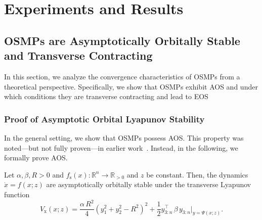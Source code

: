 \section{Experiments and Results}\label{sec:osmp:results}
\subsection{OSMPs are Asymptotically Orbitally Stable and Transverse Contracting}
In this section, we analyze the convergence characteristics of \glspl{OSMP} from a theoretical perspective. Specifically, we show that \glspl{OSMP} exhibit \gls{AOS} and under which conditions they are transverse contracting and lead to \gls{EOS}

\subsubsection{Proof of Asymptotic Orbital Lyapunov Stability}
In the general setting, we show that \glspl{OSMP} possess \gls{AOS}. This property was noted—but not fully proven—in earlier work~\citep{urain2020imitationflow,zhi2024teaching}. Instead, in the following, we formally prove \gls{AOS}.
\begin{theorem}\label{theorem:osmp:asymptotic_orbital_stability}
    Let $\alpha, \beta, R > 0$ and $f_\mathrm{s}(x): \mathbb{R}^n \to \mathbb{R}_{>0}$ and $z$ be constant. Then, the dynamics $\dot{x} = f(x;z)$ are asymptotically orbitally stable under the transverse Lyapunov function
    \begin{equation}
        V_\mathrm{x}(x;z) = \frac{\alpha \, R^2}{4} \left ( y_1^2+y_2^2 - R^2 \right )^2 + \frac{1}{2} y_{3:n}^\top \, \beta \, y_{3:n} \Bigg |_{y=\Psi(x;z)}.
    \end{equation}
\end{theorem}
